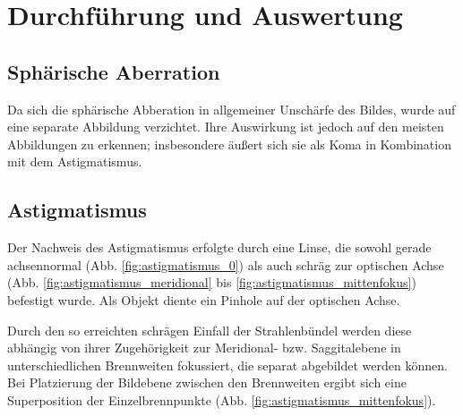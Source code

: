 \section{Durchführung und Auswertung}

\subsection{Sphärische Aberration}

Da sich die sphärische Abberation in allgemeiner Unschärfe des Bildes, wurde auf eine separate Abbildung verzichtet. Ihre Auswirkung ist jedoch auf den meisten Abbildungen zu erkennen; insbesondere äußert sich sie als Koma in Kombination mit dem Astigmatismus.

\subsection{Astigmatismus}

Der Nachweis des Astigmatismus erfolgte durch eine Linse, die sowohl gerade achsennormal (Abb. \ref{fig:astigmatismus_0}) als auch schräg zur optischen Achse (Abb. \ref{fig:astigmatismus_meridional} bis \ref{fig:astigmatismus_mittenfokus}) befestigt wurde. Als Objekt diente ein Pinhole auf der optischen Achse. 

Durch den so erreichten schrägen Einfall der Strahlenbündel werden diese abhängig von ihrer Zugehörigkeit zur Meridional- bzw. Saggitalebene in unterschiedlichen Brennweiten fokussiert, die separat abgebildet werden können. Bei Platzierung der Bildebene zwischen den Brennweiten ergibt sich eine Superposition der Einzelbrennpunkte (Abb. \ref{fig:astigmatismus_mittenfokus}).

